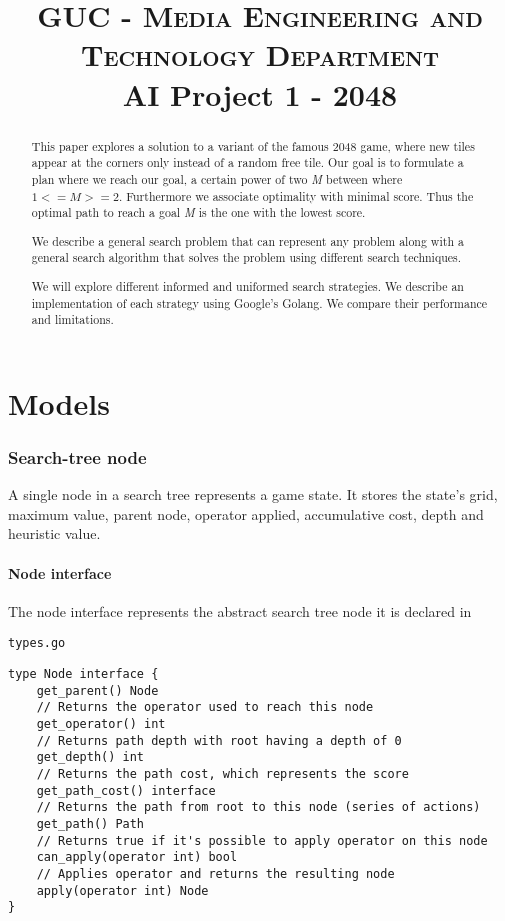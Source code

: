 \documentclass[14pt,a4paper]{report}
\begin{document}
\title{
    \textsc{GUC - Media Engineering and Technology Department} \\
    AI Project 1 - 2048
}


\renewcommand{\abstractname}{Brief}
\begin{abstract}
This paper explores a solution to a variant of the famous 2048 game, where new tiles
appear at the corners only instead of a random free tile. Our goal is to formulate a plan
where we reach our goal, a certain power of two \emph{M} between where $1 <= M >=2$. 
Furthermore we associate optimality with minimal score. Thus the optimal path to reach a goal
\emph{M} is the one with the lowest score.

We describe a general search problem that can represent any problem along with a general search algorithm that solves the problem using different search techniques.

We will explore different informed and uniformed search strategies. We describe an implementation of each strategy using Google's Golang. We compare their performance and limitations.


\end{abstract}

\tableofcontents

\part{Models}

\section{Search-tree node}
A single node in a search tree represents a game state. It stores the state's 
grid, maximum value, parent node, operator applied, accumulative cost, depth and
heuristic value. 



\subsection{Node interface}
The node interface represents the abstract search tree node it is declared
in \begin{verbatim}types.go\end{verbatim}
\begin{lstlisting}
type Node interface {
    get_parent() Node
    // Returns the operator used to reach this node
    get_operator() int
    // Returns path depth with root having a depth of 0
    get_depth() int
    // Returns the path cost, which represents the score
    get_path_cost() interface
    // Returns the path from root to this node (series of actions)
    get_path() Path
    // Returns true if it's possible to apply operator on this node
    can_apply(operator int) bool
    // Applies operator and returns the resulting node
    apply(operator int) Node
}
\end{lstlisting}
\end{document}
